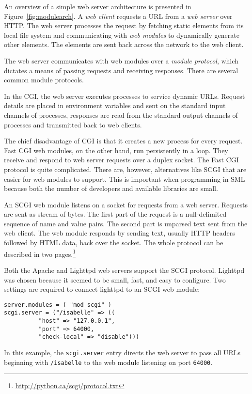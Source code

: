 \documentclass[a4paper,draft]{article} %
\newcommand{\reffig}[1]{Figure~\ref{fig:#1}}
\begin{document}
An overview of a simple web server architecture is presented in 
\reffig{modulearch}.
A \emph{web client} requests a \ac{URL} from a \emph{web server} over 
\ac{HTTP}.
The web server processes the request by fetching static elements from its 
local file system and communicating with \emph{web modules} to dynamically 
generate other elements.
The elements are sent back across the network to the web client.

The web server communicates with web modules over a \emph{module protocol}, 
which dictates a means of passing requests and receiving responses.
There are several common module protocols.

In the \ac{CGI}, the web server executes processes to service dynamic 
\acp{URL}.
Request details are placed in environment variables and sent on the standard 
input channels of processes, responses are read from the standard output 
channels of processes and transmitted back to web clients.

The chief disadvantage of \ac{CGI} is that it creates a new process for 
every request.
Fast \ac{CGI} web modules, on the other hand, run persistently in a loop.
They receive and respond to web server requests over a duplex socket.
The Fast \ac{CGI} protocol is quite complicated.
There are, however, alternatives like \ac{SCGI} that are easier for web 
modules to support.
This is important when programming in \ac{SML} because both the number of 
developers and available libraries are small.

An \ac{SCGI} web module listens on a socket for requests from a web server.
Requests are sent as stream of bytes.
The first part of the request is a null-delimited sequence of name and value 
pairs.
The second part is unparsed text sent from the web client.
The web module responds by sending text, usually \ac{HTTP} headers followed 
by \ac{HTML} data, back over the socket.
The whole protocol can be described in two 
pages.\footnote{\url{http://python.ca/scgi/protocol.txt}}

Both the Apache and Lighttpd web servers support the \ac{SCGI} protocol.
Lighttpd was chosen because it seemed to be small, fast, and easy to 
configure.
Two settings are required to connect lighttpd to an \ac{SCGI} web module: 
\begin{verbatim}
server.modules = ( "mod_scgi" )
scgi.server = ("/isabelle" => ((
		  "host" => "127.0.0.1",
		  "port" => 64000,
		  "check-local" => "disable")))
\end{verbatim}
In this example, the \texttt{scgi.server} entry directs the web server to 
pass all \acp{URL} beginning with \texttt{/isabelle} to the web module 
listening on port \texttt{64000}.
\end{document}
